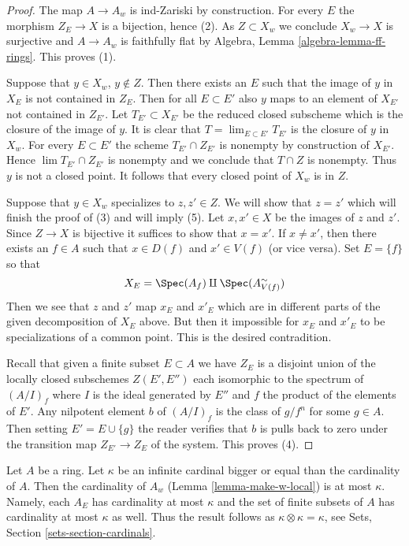 \begin{proof}
The map $A \to A_w$ is ind-Zariski by construction.
For every $E$ the morphism $Z_E \to X$ is a bijection, hence (2).
As $Z \subset X_w$ we conclude $X_w \to X$ is surjective and
$A \to A_w$ is faithfully flat by
Algebra, Lemma \ref{algebra-lemma-ff-rings}. This proves (1).

\medskip\noindent
Suppose that $y \in X_w$, $y \not \in Z$. Then there
exists an $E$ such that the image of $y$ in $X_E$ is not contained in
$Z_E$. Then for all $E \subset E'$ also $y$ maps to an element of $X_{E'}$
not contained in $Z_{E'}$. Let $T_{E'} \subset X_{E'}$ be the reduced
closed subscheme which is the closure of the image of $y$. It is
clear that $T = \lim_{E \subset E'} T_{E'}$ is the closure of $y$ in $X_w$.
For every $E \subset E'$ the scheme $T_{E'} \cap Z_{E'}$ is nonempty
by construction of $X_{E'}$. Hence $\lim T_{E'} \cap Z_{E'}$ is nonempty
and we conclude that $T \cap Z$ is nonempty. Thus $y$ is not a closed point.
It follows that every closed point of $X_w$ is in $Z$.

\medskip\noindent
Suppose that $y \in X_w$ specializes to $z, z' \in Z$. We will show that
$z = z'$ which will finish the proof of (3) and will imply (5).
Let $x, x' \in X$ be the images of $z$ and $z'$. Since $Z \to X$ is
bijective it suffices to show that $x = x'$. If $x \not = x'$, then
there exists an $f \in A$ such that $x \in D(f)$ and $x' \in V(f)$
(or vice versa). Set $E = \{f\}$ so that
$$
X_E = \Spec(A_f) \amalg \Spec(A_{V(f)}^\sim)
$$
Then we see that $z$ and $z'$ map $x_E$ and $x'_E$ which are in different
parts of the given decomposition of $X_E$ above. But then it impossible
for $x_E$ and $x'_E$ to be specializations of a common point.
This is the desired contradition.

\medskip\noindent
Recall that given a finite subset $E \subset A$ we have $Z_E$
is a disjoint union of the locally closed subschemes $Z(E', E'')$
each isomorphic to the spectrum of $(A/I)_f$ where $I$ is the ideal
generated by $E''$ and $f$ the product of the elements of $E'$.
Any nilpotent element $b$ of $(A/I)_f$ is the class of $g/f^n$
for some $g \in A$. Then setting $E' = E \cup \{g\}$ the reader
verifies that $b$ is pulls back to zero under the transition map
$Z_{E'} \to Z_E$ of the system. This proves (4).
\end{proof}

\begin{remark}
\label{remark-size-w}
Let $A$ be a ring. Let $\kappa$ be an infinite cardinal bigger or
equal than the cardinality of $A$. Then the cardinality of $A_w$
(Lemma \ref{lemma-make-w-local})
is at most $\kappa$. Namely, each $A_E$ has cardinality at most
$\kappa$ and the set of finite subsets of $A$ has cardinality at most $\kappa$
as well. Thus the result follows as $\kappa \otimes \kappa = \kappa$, see
Sets, Section \ref{sets-section-cardinals}.
\end{remark}

